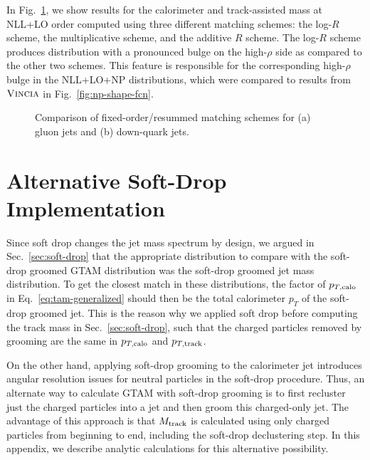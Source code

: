 \documentclass[letterpaper,11pt]{article}
\newcommand{\Fig}[1]{Fig.~\ref{#1}}
\newcommand{\Sec}[1]{Sec.~\ref{#1}}
\newcommand{\Eq}[1]{Eq.~\eqref{#1}}
\begin{document}
In \Fig{fig:matching-compare}, we show results for the calorimeter and track-assisted mass at NLL+LO order computed using three different matching schemes: the log-$R$ scheme, the multiplicative scheme, and the additive $R$ scheme. 
%
The log-$R$ scheme produces distribution with a pronounced bulge on the high-$\rho$ side as compared to the other two schemes. 
%
This feature is responsible for the corresponding high-$\rho$ bulge in the NLL+LO+NP distributions, which were compared to results from $\textsc{Vincia}$ in \Fig{fig:np-shape-fcn}. 

\begin{figure}[t]
	\centering
	\caption{\label{fig:matching-compare} Comparison of fixed-order/resummed matching schemes for (a) gluon jets and (b) down-quark jets.}
\end{figure}






\section{Alternative Soft-Drop Implementation}
\label{app:alternate-sd-implementation}


Since soft drop changes the jet mass spectrum by design, we argued in \Sec{sec:soft-drop} that the appropriate distribution to compare with the soft-drop groomed GTAM distribution was the soft-drop groomed jet mass distribution.
%
To get the closest match in these distributions, the factor of $p_{T,\rm calo}$ in \Eq{eq:tam-generalized} should then be the total calorimeter $p_T$ of the soft-drop groomed jet.
%
This is the reason why we applied soft drop before computing the track mass in \Sec{sec:soft-drop}, such that the charged particles removed by grooming are the same in $p_{T,\rm calo}$ and $p_{T,\rm track}$.

On the other hand, applying soft-drop grooming to the calorimeter jet introduces angular resolution issues for neutral particles in the soft-drop procedure.
%
Thus, an alternate way to calculate GTAM with soft-drop grooming is to first recluster just the charged particles into a jet and then groom this charged-only jet.
%
The advantage of this approach is that $M_{\rm track}$ is calculated using only charged particles from beginning to end, including the soft-drop declustering step.
%
In this appendix, we describe analytic calculations for this alternative possibility.
\end{document}
